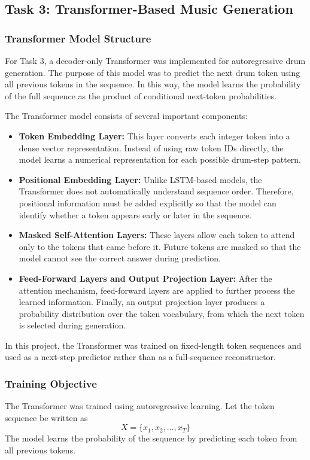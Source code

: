 \documentclass[conference]{IEEEtran}
\begin{document}
\subsection{Task 3: Transformer-Based Music Generation}

\subsubsection{Transformer Model Structure}
For Task 3, a decoder-only Transformer was implemented for autoregressive drum generation. The purpose of this model was to predict the next drum token using all previous tokens in the sequence. In this way, the model learns the probability of the full sequence as the product of conditional next-token probabilities.

The Transformer model consists of several important components:
\begin{itemize}
    \item \textbf{Token Embedding Layer:} This layer converts each integer token into a dense vector representation. Instead of using raw token IDs directly, the model learns a numerical representation for each possible drum-step pattern.
    \item \textbf{Positional Embedding Layer:} Unlike LSTM-based models, the Transformer does not automatically understand sequence order. Therefore, positional information must be added explicitly so that the model can identify whether a token appears early or later in the sequence.
    \item \textbf{Masked Self-Attention Layers:} These layers allow each token to attend only to the tokens that came before it. Future tokens are masked so that the model cannot see the correct answer during prediction.
    \item \textbf{Feed-Forward Layers and Output Projection Layer:} After the attention mechanism, feed-forward layers are applied to further process the learned information. Finally, an output projection layer produces a probability distribution over the token vocabulary, from which the next token is selected during generation.
\end{itemize}
In this project, the Transformer was trained on fixed-length token sequences and used as a next-step predictor rather than as a full-sequence reconstructor.

\subsubsection{Training Objective}
The Transformer was trained using autoregressive learning. Let the token sequence be written as
\[
X = \{x_1, x_2, \dots, x_T\}
\]
The model learns the probability of the sequence by predicting each token from all previous tokens.
\end{document}
